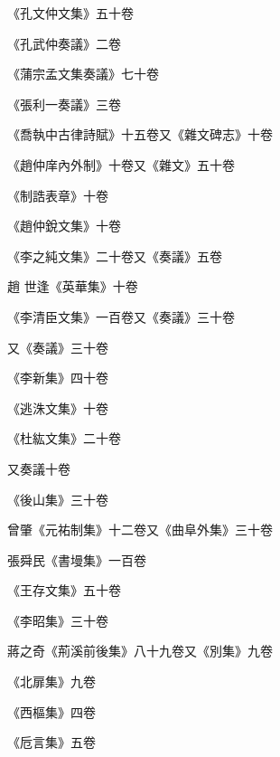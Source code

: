 \begin{pinyinscope}
 《孔文仲文集》五十卷



 《孔武仲奏議》二卷



 《蒲宗孟文集奏議》七十卷



 《張利一奏議》三卷



 《喬執中古律詩賦》十五卷又《雜文碑志》十卷



 《趙仲庠內外制》十卷又《雜文》五十卷



 《制誥表章》十卷



 《趙仲銳文集》十卷



 《李之純文集》二十卷又《奏議》五卷



 趙
 世逢《英華集》十卷



 《李清臣文集》一百卷又《奏議》三十卷



 又《奏議》三十卷



 《李新集》四十卷



 《逃洙文集》十卷



 《杜紘文集》二十卷



 又奏議十卷



 《後山集》三十卷



 曾肇《元祐制集》十二卷又《曲阜外集》三十卷



 張舜民《書墁集》一百卷



 《王存文集》五十卷



 《李昭集》三十卷



 蔣之奇《荊溪前後集》八十九卷又《別集》九卷



 《北扉集》九卷



 《西樞集》四卷



 《卮言集》五卷




\end{pinyinscope}

